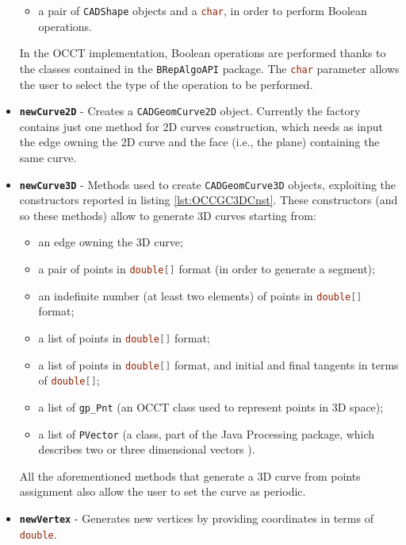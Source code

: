 \begin{itemize}
\begin{itemize}
	\item a pair of \lstinline[language=Java]!CADShape! objects and a \lstinline[language=Java]!char!, in order to perform Boolean operations.
	\end{itemize}
In the \gls{OCCT} implementation, Boolean operations are performed thanks to the classes contained in the \lstinline[language=Java]!BRepAlgoAPI! package. The \lstinline[language=Java]!char! parameter allows the user to select the type of the operation to be performed.
\item \textbf{\lstinline[language=Java]!newCurve2D!} - Creates a \lstinline[language=Java]!CADGeomCurve2D! object. Currently the factory contains just one method for 2D curves construction, which needs as input the edge owning the 2D curve and the face (i.e., the plane) containing the same curve.
\item \textbf{\lstinline[language=Java]!newCurve3D!} - Methods used to create \lstinline[language=Java]!CADGeomCurve3D! objects, exploiting the constructors reported in listing \ref{lst:OCCGC3DCnst}. These constructors (and so these methods) allow to generate 3D curves starting from:
	\begin{itemize}
	\item an edge owning the 3D curve;
	\item a pair of points in \lstinline[language=Java]!double[]! format (in order to generate a segment);
	\item an indefinite number (at least two elements) of points in \lstinline[language=Java]!double[]! format;
	\item a list of points in \lstinline[language=Java]!double[]! format;
	\item a list of points in \lstinline[language=Java]!double[]! format, and initial and final tangents in terms of \lstinline[language=Java]!double[]!;
	\item a list of \lstinline[language=Java]!gp_Pnt! (an \gls{OCCT} class used to represent points in 3D space);
	\item a list of \lstinline[language=Java]!PVector! (a class, part of the Java Processing package, which describes two or three dimensional vectors \cite{PVector}).
	\end{itemize}
All the aforementioned methods that generate a 3D curve from points assignment also allow the user to set the curve as periodic.
\item \textbf{\lstinline[language=Java]!newVertex!} - Generates new vertices by providing coordinates in terms of \lstinline[language=Java]!double!.

\end{itemize}
